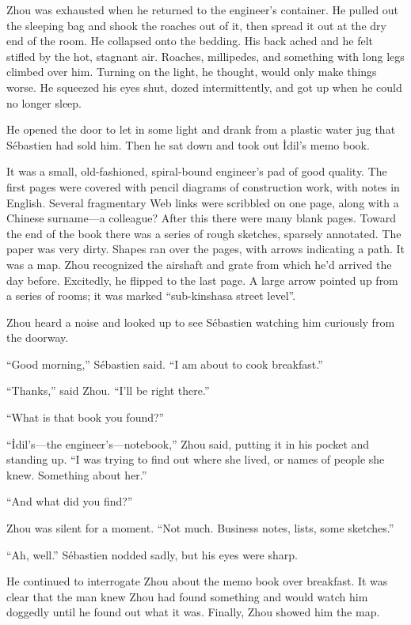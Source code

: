 \documentclass[10pt,a4paper]{article}
\begin{document}
\bigskip

Zhou was exhausted when he returned to the engineer's container.
He pulled out the sleeping bag and shook the roaches out of it,
then spread it out at the dry end of the room. He collapsed onto
the bedding. His back ached and he felt stifled by the hot, stagnant
air. Roaches, millipedes, and something with long legs climbed over
him. Turning on the light, he thought, would only make things worse.
He squeezed his eyes shut, dozed intermittently, and got up when
he could no longer sleep.

He opened the door to let in some light and drank from a plastic
water jug that S\'{e}bastien had sold him. Then he sat down and took
out \.{I}dil's memo book.

It was a small, old-fashioned, spiral-bound engineer's pad of
good quality. The first pages were covered with pencil diagrams of
construction work, with notes in English. Several fragmentary Web
links were scribbled on one page, along with a Chinese surname---a
colleague? After this there were many blank pages. Toward the
end of the book there was a series of rough sketches, sparsely
annotated. The paper was very dirty. Shapes ran over the pages,
with arrows indicating a path. It was a map. Zhou recognized the
airshaft and grate from which he'd arrived the day before. Excitedly,
he flipped to the last page. A large arrow pointed up from a series
of rooms; it was marked ``sub-kinshasa street level''.

Zhou heard a noise and looked up to see S\'{e}bastien watching him
curiously from the doorway.

``Good morning,'' S\'{e}bastien said. ``I am about to cook breakfast.''

``Thanks,'' said Zhou. ``I'll be right there.''

``What is that book you found?''

``\.{I}dil's---the engineer's---notebook,'' Zhou said, putting it in his
pocket and standing up. ``I was trying to find out where she lived,
or names of people she knew. Something about her.''

``And what did you find?''

Zhou was silent for a moment. ``Not much. Business notes, lists,
some sketches.''

``Ah, well.'' S\'{e}bastien nodded sadly, but his eyes were sharp.

He continued to interrogate Zhou about the memo book over
breakfast. It was clear that the man knew Zhou had found something
and would watch him doggedly until he found out what it was. Finally,
Zhou showed him the map.
\end{document}
